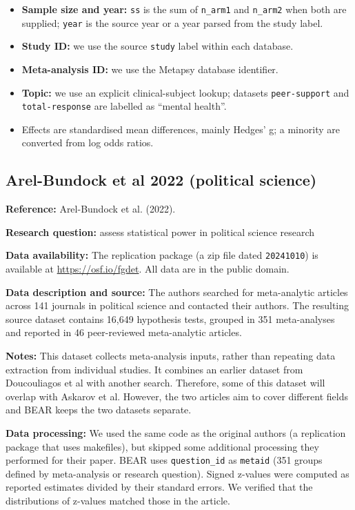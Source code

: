 \documentclass[
  11pt,
]{article}
\begin{document}
\begin{itemize}
\item
  \textbf{Sample size and year:} \texttt{ss} is the sum of
  \texttt{n\_arm1} and \texttt{n\_arm2} when both are supplied;
  \texttt{year} is the source year or a year parsed from the study
  label.
\item
  \textbf{Study ID:} we use the source \texttt{study} label within each
  database.
\item
  \textbf{Meta-analysis ID:} we use the Metapsy database identifier.
\item
  \textbf{Topic:} we use an explicit clinical-subject lookup; datasets
  \texttt{peer-support} and \texttt{total-response} are labelled as
  ``mental health''.
\item
  Effects are standardised mean differences, mainly Hedges' g; a
  minority are converted from log odds ratios.
\end{itemize}

\newpage

\subsection{Arel-Bundock et al 2022 (political
science)}\label{arel-bundock-et-al-2022-political-science}

\textbf{Reference:} Arel-Bundock et al. (2022).

\textbf{Research question:} assess statistical power in political
science research

\textbf{Data availability:} The replication package (a zip file dated
\texttt{20241010}) is available at \url{https://osf.io/fgdet}. All data
are in the public domain.

\textbf{Data description and source:} The authors searched for
meta-analytic articles across 141 journals in political science and
contacted their authors. The resulting source dataset contains 16,649
hypothesis tests, grouped in 351 meta-analyses and reported in 46
peer-reviewed meta-analytic articles.

\textbf{Notes:} This dataset collects meta-analysis inputs, rather than
repeating data extraction from individual studies. It combines an
earlier dataset from Doucouliagos et al with another search. Therefore,
some of this dataset will overlap with Askarov et al. However, the two
articles aim to cover different fields and BEAR keeps the two datasets
separate.

\textbf{Data processing:} We used the same code as the original authors
(a replication package that uses makefiles), but skipped some additional
processing they performed for their paper. BEAR uses
\texttt{question\_id} as \texttt{metaid} (351 groups defined by
meta-analysis or research question). Signed z-values were computed as
reported estimates divided by their standard errors. We verified that
the distributions of z-values matched those in the article.
\end{document}
